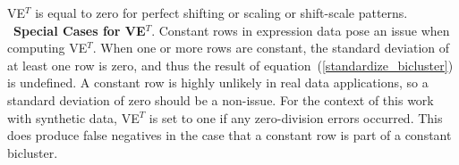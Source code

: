 VE$^T$ is equal to zero for perfect shifting or scaling or shift-scale patterns.\\

\noindent\ {\bf Special Cases for VE$^T$}.
Constant rows in expression data pose an issue when computing VE$^T$. When one or more rows are constant, the standard deviation of at least one row is zero, and thus the result of equation~(\ref{standardize_bicluster}) is undefined. 
A constant row is highly unlikely in real data applications, so a standard deviation of zero should be a non-issue. For the context of this work with synthetic data, VE$^T$ is set to one if any zero-division errors occurred. This does produce false negatives in the case that a constant row is part of a constant bicluster. \\


